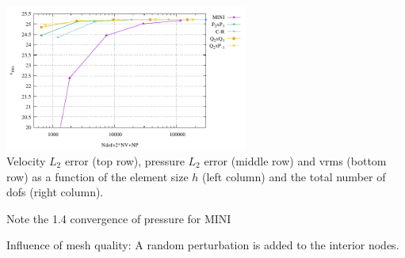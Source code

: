 \begin{center}
\includegraphics[width=8cm]{python_codes/fieldstone_112/results/exp4/vrms_ndof.pdf}\\
{\captionfont Velocity $L_2$ error (top row), pressure $L_2$ error (middle row) and vrms (bottom row) 
as a function of the element size $h$ (left column) and the total number of dofs (right column).}
\end{center}

Note the 1.4 convergence of pressure for MINI

\newpage
Influence of mesh quality: A random perturbation is added to the interior nodes. 

